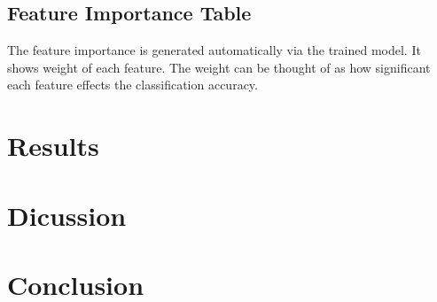 \documentclass[10pt, a4paper, twocolumn]{article} %
\begin{document}
\subsection{Feature Importance Table}
The feature importance is generated automatically via the trained model. It shows weight of each feature. The weight can 
be thought of as how significant each feature effects the classification accuracy. 
\section{Results}
\section{Dicussion}
\section{Conclusion}

\printbibliography[title={Bibliography}] %

\end{document}
